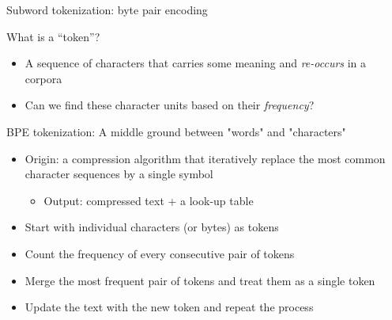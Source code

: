 \documentclass[usenames,dvipsnames,notes,11pt,aspectratio=169,hyperref={colorlinks=true, linkcolor=blue}]{beamer}
\begin{document}
\begin{frame}
    {Subword tokenization: byte pair encoding}

    What is a ``token''?\\
    \begin{itemize}
        \item A sequence of characters that carries some meaning and {\it re-occurs} in a corpora
        \item Can we find these character units based on their {\it frequency}?
    \end{itemize}

    \pause\medskip
    BPE tokenization: A middle ground between "words" and "characters"\\
    \begin{itemize}
        \item Origin: a compression algorithm that iteratively replace the most common character sequences by a single symbol 
            \begin{itemize}
                \item Output: compressed text + a look-up table
            \end{itemize}
                \item Start with individual characters (or bytes) as tokens
                \item Count the frequency of every consecutive pair of tokens
                \item Merge the most frequent pair of tokens and treat them as a single token
                \item Update the text with the new token and repeat the process
    \end{itemize}
\end{frame}
\end{document}
